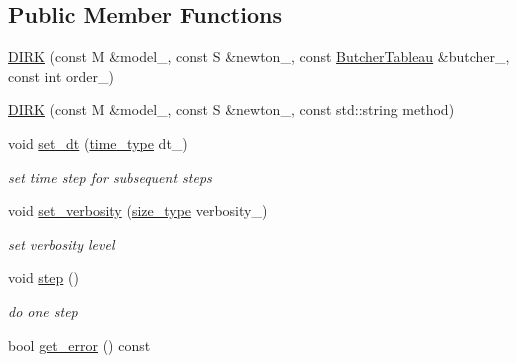 \subsection*{Public Member Functions}
\begin{DoxyCompactItemize}
\item 
\hyperlink{classhdnum_1_1DIRK_a4c6a823702e9e8b885cd4b81be861d51}{DIRK} (const M \&model\_\-, const S \&newton\_\-, const \hyperlink{classhdnum_1_1Matrix}{ButcherTableau} \&butcher\_\-, const int order\_\-)
\item 
\hyperlink{classhdnum_1_1DIRK_ab914c53100346697592513bdae05c668}{DIRK} (const M \&model\_\-, const S \&newton\_\-, const std::string method)
\item 
\hypertarget{classhdnum_1_1DIRK_a425388f8d85dac93e59155ff6e4b8578}{
void \hyperlink{classhdnum_1_1DIRK_a425388f8d85dac93e59155ff6e4b8578}{set\_\-dt} (\hyperlink{classhdnum_1_1DIRK_a91204fa2e007b5eed35034bfe409037b}{time\_\-type} dt\_\-)}
\label{classhdnum_1_1DIRK_a425388f8d85dac93e59155ff6e4b8578}

\begin{DoxyCompactList}\small\item\em set time step for subsequent steps \item\end{DoxyCompactList}\item 
\hypertarget{classhdnum_1_1DIRK_ab32055e261f7b4dd49b5458d33e7abe5}{
void \hyperlink{classhdnum_1_1DIRK_ab32055e261f7b4dd49b5458d33e7abe5}{set\_\-verbosity} (\hyperlink{classhdnum_1_1DIRK_a80ab2ad1360bc6061cea64d7a5ca9d12}{size\_\-type} verbosity\_\-)}
\label{classhdnum_1_1DIRK_ab32055e261f7b4dd49b5458d33e7abe5}

\begin{DoxyCompactList}\small\item\em set verbosity level \item\end{DoxyCompactList}\item 
\hypertarget{classhdnum_1_1DIRK_a374aa0f371c2fc1d0b0dd64610629c08}{
void \hyperlink{classhdnum_1_1DIRK_a374aa0f371c2fc1d0b0dd64610629c08}{step} ()}
\label{classhdnum_1_1DIRK_a374aa0f371c2fc1d0b0dd64610629c08}

\begin{DoxyCompactList}\small\item\em do one step \item\end{DoxyCompactList}\item 
\hypertarget{classhdnum_1_1DIRK_aa4b8eff08392d8860fc21a0d4128214e}{
bool \hyperlink{classhdnum_1_1DIRK_aa4b8eff08392d8860fc21a0d4128214e}{get\_\-error} () const }
\label{classhdnum_1_1DIRK_aa4b8eff08392d8860fc21a0d4128214e}


\end{DoxyCompactItemize}
